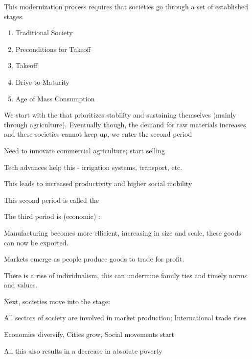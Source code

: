This modernization process requires that societies go through a set of established stages.
\begin{enumerate}
	\item Traditional Society
	\item Preconditions for Takeoff
	\item Takeoff
	\item Drive to Maturity
	\item Age of Mass Consumption
\end{enumerate}

We start with the  that prioritizes stability and sustaining themselves (mainly through agriculture). Eventually though, the demand for raw materials increases and these societies cannot keep up, we enter the second period
\begin{bullets}
	\item Need to innovate commercial agriculture; start selling 
	\item Tech advances help this - irrigation systems, transport, etc.
	\item This leads to increased productivity and higher social mobility
\end{bullets}
This second period is called the 

The third period is (economic) :
\begin{bullets}
	\item Manufacturing becomes more efficient, increasing in size and scale, these goods can now be exported.
	\item Markets emerge as people produce goods to trade for profit.
	\item There is a rise of individualism, this can undermine family ties and timely norms and values.
\end{bullets}

Next, societies move into the  stage:
\begin{bullets}
	\item All sectors of society are involved in market production; International trade rises
	\item Economies diversify, Cities grow, Social movements start
	\item All this also results in a decrease in absolute poverty
\end{bullets}


